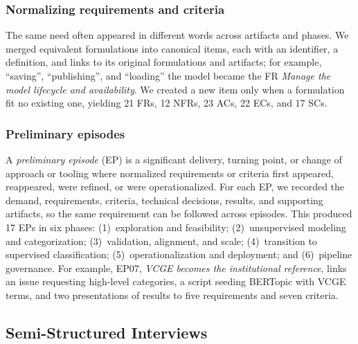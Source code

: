 \documentclass[sigconf,nonacm]{acmart}
\newif\ifshownotes
\newcommand{\gnote}[1]{\ifshownotes{\color{blue}\textbf{[G:} #1\textbf{]}}\fi}
\newcommand{\rnote}[1]{\ifshownotes{\color{red}\textbf{[R:} #1\textbf{]}}\fi}
\newcommand{\csnote}[1]{\ifshownotes{\color{orange}\textbf{[CS:} #1\textbf{]}}\fi}
\begin{document}
\subsubsection{Normalizing requirements and criteria}
The same need often appeared in different words across artifacts and phases. We merged equivalent formulations into canonical items, each with an identifier, a definition, and links to its original formulations and artifacts; for example, ``saving'', ``publishing'', and ``loading'' the model became the FR \emph{Manage the model lifecycle and availability}. We created a new item only when a formulation fit no existing one, yielding 21 FRs, 12 NFRs, 23 ACs, 22 ECs, and 17 SCs.


\subsubsection{Preliminary episodes}
\label{sec:episodes}
A \emph{preliminary episode} (EP) is a significant delivery, turning point, or change of approach or tooling where normalized requirements or criteria first appeared, reappeared, were refined, or were operationalized. For each EP, we recorded the demand, requirements, criteria, technical decisions, results, and supporting artifacts, so the same requirement can be followed across episodes. This produced 17 EPs in six phases: (1)~exploration and feasibility; (2)~unsupervised modeling and categorization; (3)~validation, alignment, and scale; (4)~transition to supervised classification; (5)~operationalization and deployment; and (6)~pipeline governance. For example, EP07, \emph{VCGE becomes the institutional reference}, links an issue requesting high-level categories, a script seeding BERTopic with VCGE terms, and two presentations of results to five requirements and seven criteria.


\subsection{Semi-Structured Interviews}
\label{sec:interviews}
\end{document}
